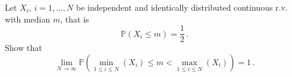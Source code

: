 \documentclass[letterpaper,12pt,addpoints]{exam}
\renewcommand{\Pr}{\mathbb{P}}
\newcommand{\E}{\mathbb{E}}
\begin{document}
\begin{questions}
\vspace*{\fill}\eject


\bonusquestion[15] Let $X_i$, $i=1,\ldots,N$ be independent and identically 
distributed continuous r.v. with median $m$, that is
\[
 \Pr(X_i\leq m)=\frac12\, .
\]
Show that
\[
 \lim_{N\to\infty}\Pr\left(\min_{1\leq i\leq N}(X_i)\leq m<\max_{1\leq i\leq 
N}(X_i)\right)=1\, .
\]



\vspace*{\fill}\eject


\end{questions}


% 
% 
% 
% 
% 
% 
% 
% 
\end{document}
